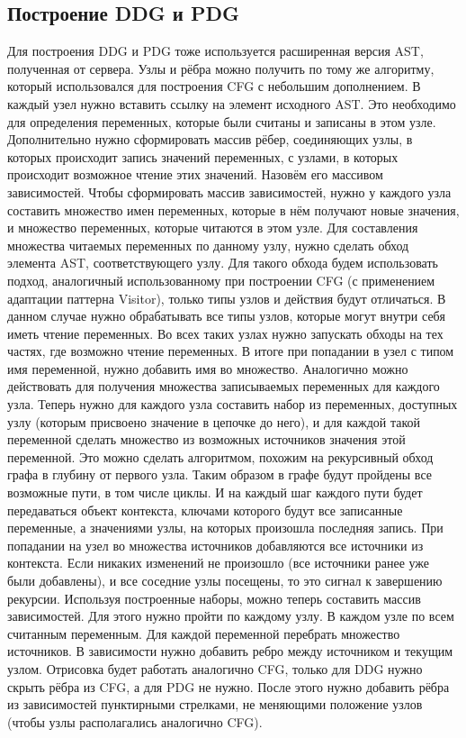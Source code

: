 \subsection{Построение DDG и PDG} \label{ch2:subsec-title-abbr}
Для построения DDG и PDG тоже используется расширенная версия AST, полученная от сервера. Узлы и рёбра можно получить по тому же алгоритму, который использовался для построения CFG с небольшим дополнением. В каждый узел нужно вставить ссылку на элемент исходного AST. Это необходимо для определения переменных, которые были считаны и записаны в этом узле. Дополнительно нужно сформировать массив рёбер, соединяющих узлы, в которых происходит запись значений переменных, с узлами, в которых происходит возможное чтение этих значений. Назовём его массивом зависимостей.
Чтобы сформировать массив зависимостей, нужно у каждого узла составить множество имен переменных, которые в нём получают новые значения, и множество переменных, которые читаются в этом узле.
Для составления множества читаемых переменных по данному узлу, нужно сделать обход элемента AST, соответствующего узлу. Для такого обхода будем использовать подход, аналогичный использованному при построении CFG (с применением адаптации паттерна Visitor), только типы узлов и действия будут отличаться. В данном случае нужно обрабатывать все типы узлов, которые могут внутри себя иметь чтение переменных. Во всех таких узлах нужно запускать обходы на тех частях, где возможно чтение переменных. В итоге при попадании в узел с типом имя переменной, нужно добавить имя во множество. Аналогично можно действовать для получения множества записываемых переменных для каждого узла.
Теперь нужно для каждого узла составить набор из переменных, доступных узлу (которым присвоено значение в цепочке до него), и для каждой такой переменной сделать множество из возможных источников значения этой переменной. Это можно сделать алгоритмом, похожим на рекурсивный обход графа в глубину от первого узла. Таким образом в графе будут пройдены все возможные пути, в том числе циклы. И на каждый шаг каждого пути будет передаваться объект контекста, ключами которого будут все записанные переменные, а значениями узлы, на которых произошла последняя запись. При попадании на узел во множества источников добавляются все источники из контекста. Если никаких изменений не произошло (все источники ранее уже были добавлены), и все соседние узлы посещены, то это сигнал к завершению рекурсии.
Используя построенные наборы, можно теперь составить массив зависимостей. Для этого нужно пройти по каждому узлу. В каждом узле по всем считанным переменным. Для каждой переменной перебрать множество источников. В зависимости нужно добавить ребро между источником и текущим узлом.
Отрисовка будет работать аналогично CFG, только для DDG нужно скрыть рёбра из CFG, а для PDG не нужно. После этого нужно добавить рёбра из зависимостей пунктирными стрелками, не меняющими положение узлов (чтобы узлы располагались аналогично CFG).
